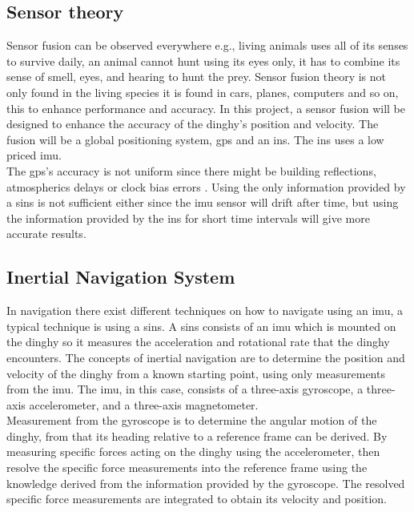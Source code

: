 
\newpage


\subsection*{Sensor theory}
Sensor fusion can be observed everywhere e.g., living animals uses all of its senses to survive daily, an animal cannot hunt using its eyes only, it has to combine its sense of smell, eyes, and hearing to hunt the prey\cite{animal}. Sensor fusion theory is not only found in the living species it is found in cars, planes, computers and so on, this to enhance performance and accuracy. In this project, a sensor fusion will be designed to enhance the accuracy of the dinghy's position and velocity. The fusion will be a global positioning system,  \gls{gps} and an \gls{ins}. The \gls{ins} uses a low priced \gls{imu}.\\ 
The \gls{gps}'s accuracy is not uniform since there might be building reflections, atmospherics delays or clock bias errors \cite{boken}. Using the only information provided by a \gls{sins} is not sufficient either since the \gls{imu} sensor will drift after time, but using the information provided by the \gls{ins} for short time intervals will give more accurate results.  

\subsection{Inertial Navigation System}
In navigation there exist different techniques on how to navigate using an \gls{imu}, a typical technique is using a \gls{sins}. A \gls{sins} consists of an \gls{imu} which is mounted on the dinghy so it measures the acceleration and rotational rate that the dinghy encounters.
The concepts of inertial navigation are to determine the position and velocity of the dinghy from a known starting point, using only measurements from the \gls{imu}. The \gls{imu}, in this case, consists of a three-axis gyroscope, a three-axis accelerometer, and a three-axis magnetometer. \\
Measurement from the gyroscope is to determine the angular motion of the dinghy, from that its heading relative to a reference frame can be derived.
By measuring specific forces acting on the dinghy using the accelerometer, then resolve the specific force measurements into the reference frame using the knowledge derived from the information provided by the gyroscope. 
The resolved specific force measurements are integrated to obtain its velocity and position. \cite{non-linear} 


